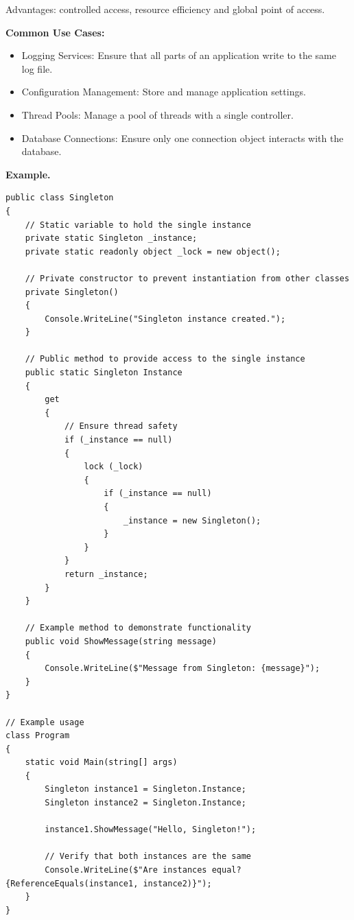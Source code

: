 Advantages: controlled access, resource efficiency and global point of access.

\textbf{Common Use Cases:}

\begin{itemize}
\item Logging Services: Ensure that all parts of an application write to the same log file.

\item Configuration Management: Store and manage application settings.

\item Thread Pools: Manage a pool of threads with a single controller.

\item Database Connections: Ensure only one connection object interacts with the database.
\end{itemize}

\textbf{Example.}

\begin{lstlisting}
public class Singleton
{
    // Static variable to hold the single instance
    private static Singleton _instance;
    private static readonly object _lock = new object();

    // Private constructor to prevent instantiation from other classes
    private Singleton()
    {
        Console.WriteLine("Singleton instance created.");
    }

    // Public method to provide access to the single instance
    public static Singleton Instance
    {
        get
        {
            // Ensure thread safety
            if (_instance == null)
            {
                lock (_lock)
                {
                    if (_instance == null)
                    {
                        _instance = new Singleton();
                    }
                }
            }
            return _instance;
        }
    }

    // Example method to demonstrate functionality
    public void ShowMessage(string message)
    {
        Console.WriteLine($"Message from Singleton: {message}");
    }
}

// Example usage
class Program
{
    static void Main(string[] args)
    {
        Singleton instance1 = Singleton.Instance;
        Singleton instance2 = Singleton.Instance;

        instance1.ShowMessage("Hello, Singleton!");

        // Verify that both instances are the same
        Console.WriteLine($"Are instances equal? {ReferenceEquals(instance1, instance2)}");
    }
}
\end{lstlisting}





